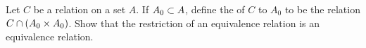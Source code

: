 \documentclass[../main.tex]{subfiles}
\begin{document}
\problem{}\label{s3p2}

Let \(C\) be a relation on a set \(A\). If \(A_0 \subset A\), define the
 of \(C\) to \(A_0\) to be the relation
\(C \cap (A_0 \times A_0)\). Show that the restriction of an equivalence
relation is an equivalence relation.

%
\end{document}
